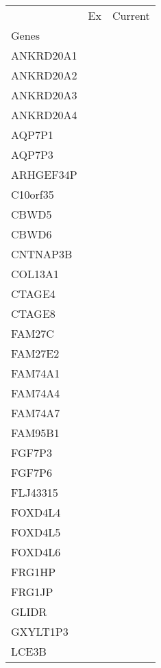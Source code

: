 \begin{tabular}{lcc}
\toprule
{} & Ex & Current \\
Genes              &    &         \\
\midrule
ANKRD20A1          &    &         \\
ANKRD20A2          &    &         \\
ANKRD20A3          &    &         \\
ANKRD20A4          &    &         \\
AQP7P1             &    &         \\
AQP7P3             &    &         \\
ARHGEF34P          &    &         \\
C10orf35           &    &         \\
CBWD5              &    &         \\
CBWD6              &    &         \\
CNTNAP3B           &    &         \\
COL13A1            &    &         \\
CTAGE4             &    &         \\
CTAGE8             &    &         \\
FAM27C             &    &         \\
FAM27E2            &    &         \\
FAM74A1            &    &         \\
FAM74A4            &    &         \\
FAM74A7            &    &         \\
FAM95B1            &    &         \\
FGF7P3             &    &         \\
FGF7P6             &    &         \\
FLJ43315           &    &         \\
FOXD4L4            &    &         \\
FOXD4L5            &    &         \\
FOXD4L6            &    &         \\
FRG1HP             &    &         \\
FRG1JP             &    &         \\
GLIDR              &    &         \\
GXYLT1P3           &    &         \\
LCE3B              &    &         \\

\end{tabular}
